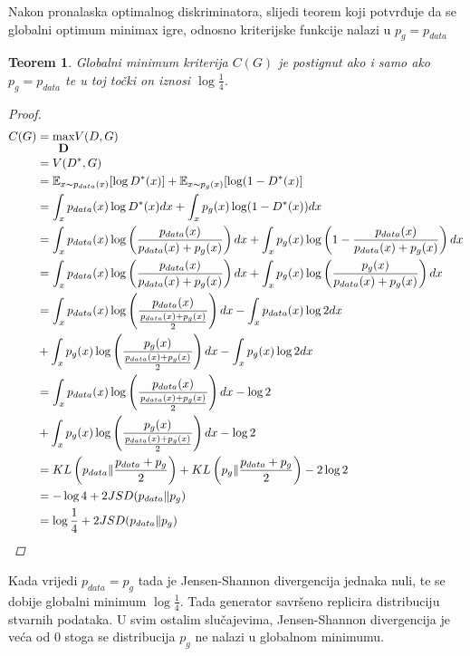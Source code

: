 \documentclass[times, utf8, diplomski]{fer}
\newtheorem{theorem}{Teorem}
\begin{document}
Nakon pronalaska optimalnog diskriminatora, slijedi teorem koji potvrđuje da se globalni optimum minimax igre, odnosno kriterijske funkcije nalazi u $p_g = p_{data}$
\begin{theorem}
Globalni minimum kriterija $C(G)$ je postignut ako i samo ako $p_g = p_{data}$ te u toj točki on iznosi $\log \frac{1}{4}$.
\begin{proof}
\begin{align}
C(G) &= \stackunder{max}{\textbf{D}} V(D,G) \\
\nonumber &= V(D^*,G) \\
\nonumber &= \mathbb{E}_{x \thicksim p_{data}(x)}[\log D^*(x)] + \mathbb{E}_{x \thicksim p_g(x)}[\log (1 - D^*(x)] \\
\nonumber &= \int_x p_{data}(x) \log D^*(x)dx + \int_x p_{g}(x) \log (1 - D^*(x))dx \\
\nonumber &= \int_x p_{data}(x) \log \left(\frac{p_{data}(x)}{p_{data}(x) + p_g(x)}\right)dx + \int_x p_g(x) \log \left(1 - \frac{p_{data}(x)}{p_{data}(x) + p_g(x)}\right)dx \\
\nonumber &= \int_x p_{data}(x) \log \left(\frac{p_{data}(x)}{p_{data}(x) + p_g(x)}\right)dx + \int_x p_g(x) \log \left(\frac{p_g(x)}{p_{data}(x) + p_g(x)}\right)dx \\
\nonumber &= \int_x p_{data}(x) \log \left(\frac{p_{data}(x)}{\frac{p_{data}(x) + p_g(x)}{2}}\right)dx - \int_x p_{data}(x)\log 2 dx \\
\nonumber &+ \int_x p_g(x) \log \left(\frac{p_g(x)}{\frac{p_{data}(x) + p_g(x)}{2}}\right)dx - \int_x p_g(x)\log 2 dx \\
\nonumber &= \int_x p_{data}(x) \log \left(\frac{p_{data}(x)}{\frac{p_{data}(x) + p_g(x)}{2}}\right)dx - \log 2 \\
\nonumber &+ \int_x p_g(x) \log \left(\frac{p_g(x)}{\frac{p_{data}(x) + p_g(x)}{2}}\right)dx - \log 2 \\
\nonumber &= KL\left(p_{data} \| \frac{p_{data} + p_g}{2}\right) + KL\left(p_g \| \frac{p_{data} + p_g}{2}\right) - 2\log2 \\
\nonumber &= -\log4 + 2JSD(p_{data} \| p_g) \\
\nonumber &= \log\frac{1}{4} + 2JSD(p_{data} \| p_g)
\end{align}
\end{proof}
\end{theorem}
Kada vrijedi $p_{data} = p_g$ tada je Jensen-Shannon divergencija jednaka nuli, te se dobije globalni minimum $\log\frac{1}{4}$. Tada generator savršeno replicira distribuciju stvarnih podataka. U svim ostalim slučajevima, Jensen-Shannon divergencija je veća od 0 stoga se distribucija $p_g$ ne nalazi u globalnom minimumu.
\end{document}
